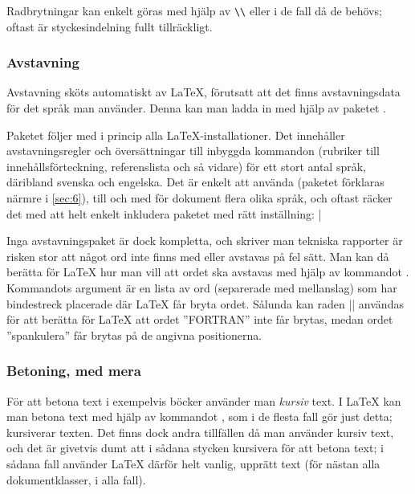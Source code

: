 \documentclass[lang=sv,ptsize=10pt,font=none,nomath,titles=bf,../../a4.tex]{subfiles}
\begin{document}
Radbrytningar kan enkelt göras med hjälp av \verb|\\| eller 
i de fall då de behövs; oftast är styckesindelning fullt tillräckligt.

\subsubsection{Avstavning}
Avstavning sköts automatiskt av \LaTeX{}, förutsatt att det finns
avstavningsdata för det språk man använder. Denna kan man ladda in med
hjälp av paketet .

Paketet  följer med i princip alla \LaTeX-installationer. 
Det innehåller avstavningsregler
och översättningar till inbyggda kommandon (rubriker till
innehållsförteckning, referenslista och så vidare) för ett stort antal
språk, däribland svenska och engelska. Det är enkelt att använda
 (paketet förklaras närmre i \cref{sec:6}), till och med
för dokument flera olika språk, och oftast räcker det med att helt
enkelt inkludera paketet med rätt inställning:
\latex|\usepackage[swedish]{babel} %

Inga avstavningspaket är dock kompletta, och skriver man tekniska 
rapporter är risken stor att något ord inte finns med eller avstavas på
fel sätt. Man kan då berätta för \LaTeX{} hur man vill att ordet ska
avstavas med hjälp av kommandot . Kommandots argument är
en lista av ord (separerade med mellanslag) som har bindestreck
placerade där \LaTeX{} får bryta ordet. Sålunda kan raden
\latex||
användas för att berätta för \LaTeX{} att ordet ”\textsc{FORTRAN}” inte 
får brytas, medan ordet ”spankulera” får brytas på de angivna 
positionerna.

\subsubsection{Betoning, med mera}
För att betona text i exempelvis böcker använder man \emph{kursiv} text. I
\LaTeX{} kan man betona text med hjälp av kommandot , som i de
flesta fall gör just detta; kursiverar texten. Det finns dock andra
tillfällen då man använder kursiv text, och det är givetvis dumt att i
sådana stycken kursivera för att betona text; i sådana fall använder
\LaTeX{} därför helt vanlig, upprätt text (för nästan alla 
dokumentklasser, i alla fall).
\end{document}
